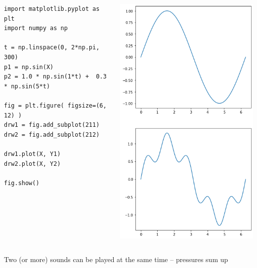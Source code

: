 \begin{frame}[fragile]%
%
\begin{columns}[T]
\begin{codebox}
\begin{verbatim}
import matplotlib.pyplot as plt
import numpy as np

t = np.linspace(0, 2*np.pi, 300)
p1 = np.sin(X)
p2 = 1.0 * np.sin(1*t) +  0.3 * np.sin(5*t)

fig = plt.figure( figsize=(6, 12) )
drw1 = fig.add_subplot(211)
drw2 = fig.add_subplot(212)

drw1.plot(X, Y1)
drw2.plot(X, Y2)

fig.show()
\end{verbatim}
\end{codebox}
%
\begin{tcolorbox}[title=Output: Superposition]
	\begin{center}
	\includegraphics[width=.8\linewidth]{./gfx/sine-superposition}
	\end{center}
\end{tcolorbox}
\end{columns}
%
Two (or more) sounds can be played at the same time -- pressures sum up
%
\end{frame}

